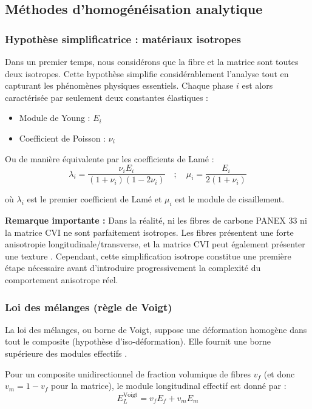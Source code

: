 \documentclass[a4paper,11pt]{article}
\begin{document}
\subsection{Méthodes d'homogénéisation analytique}

\subsubsection*{Hypothèse simplificatrice : matériaux isotropes}

Dans un premier temps, nous considérons que la fibre et la matrice sont toutes deux isotropes. Cette hypothèse simplifie considérablement l'analyse tout en capturant les phénomènes physiques essentiels. Chaque phase $i$ est alors caractérisée par seulement deux constantes élastiques :
\begin{itemize}
    \item Module de Young : $E_i$
    \item Coefficient de Poisson : $\nu_i$
\end{itemize}

Ou de manière équivalente par les coefficients de Lamé :
\begin{equation}
\lambda_i = \frac{\nu_i E_i}{(1+\nu_i)(1-2\nu_i)} \quad ; \quad \mu_i = \frac{E_i}{2(1+\nu_i)}
\end{equation}

où $\lambda_i$ est le premier coefficient de Lamé et $\mu_i$ est le module de cisaillement.

\textbf{Remarque importante :} Dans la réalité, ni les fibres de carbone PANEX 33 ni la matrice CVI ne sont parfaitement isotropes. Les fibres présentent une forte anisotropie longitudinale/transverse, et la matrice CVI peut également présenter une texture \cite{SavageCCC}. Cependant, cette simplification isotrope constitue une première étape nécessaire avant d'introduire progressivement la complexité du comportement anisotrope réel.

\subsubsection*{Loi des mélanges (règle de Voigt)}

La loi des mélanges, ou borne de Voigt, suppose une déformation homogène dans tout le composite (hypothèse d'iso-déformation). Elle fournit une borne supérieure des modules effectifs \cite{Kundalwal2017}.

Pour un composite unidirectionnel de fraction volumique de fibres $v_f$ (et donc $v_m = 1 - v_f$ pour la matrice), le module longitudinal effectif est donné par :
\begin{equation}
E_L^{\text{Voigt}} = v_f E_f + v_m E_m
\end{equation}
\end{document}
